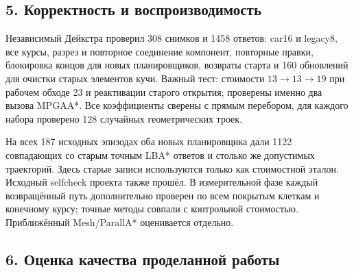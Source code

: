 \documentclass[
  10pt,
]{article}
\begin{document}
\subsection{5. Корректность и
воспроизводимость}\label{ux43aux43eux440ux440ux435ux43aux442ux43dux43eux441ux442ux44c-ux438-ux432ux43eux441ux43fux440ux43eux438ux437ux432ux43eux434ux438ux43cux43eux441ux442ux44c}

Независимый Дейкстра проверил 308 снимков и 1458 ответов: car16 и
legacy8, все курсы, разрез и повторное соединение компонент, повторные
правки, блокировка концов для новых планировщиков, возвраты старта и 160
обновлений для очистки старых элементов кучи. Важный тест: стоимости
\(13 \to 13 \to 19\) при рабочем обходе 23 и реактивации старого
открытия; проверены именно два вызова MPGAA*. Все коэффициенты сверены с
прямым перебором, для каждого набора проверено 128 случайных
геометрических троек.

На всех 187 исходных эпизодах оба новых планировщика дали 1122
совпадающих со старым точным LBA* ответов и столько же допустимых
траекторий. Здесь старые записи используются только как стоимостной
эталон. Исходный selfcheck проекта также прошёл. В измерительной фазе
каждый возвращённый путь дополнительно проверен по всем покрытым клеткам
и конечному курсу; точные методы совпали с контрольной стоимостью.
Приближённый Mesh/ParallA* оценивается отдельно.

\subsection{6. Оценка качества проделанной
работы}\label{ux43eux446ux435ux43dux43aux430-ux43aux430ux447ux435ux441ux442ux432ux430-ux43fux440ux43eux434ux435ux43bux430ux43dux43dux43eux439-ux440ux430ux431ux43eux442ux44b}
\end{document}

